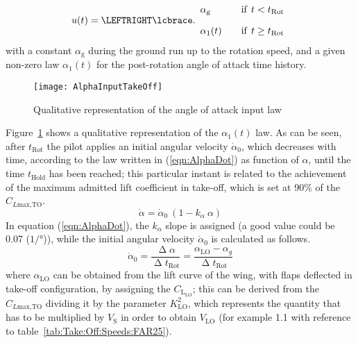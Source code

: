 \bigskip
\begin{equation}\label{eq:Take:Off:System:Dynamics:Alpha:Law}
u (t) =
    \LEFTRIGHT\lcbrace.{
      \begin{array}{l@{\rule{2em}{0pt}}l} 
        \alpha_{\text{g}}
          & \text{if} \;\, t < t_{\text{Rot}}
        \\[1em]
        \alpha_1(t)
          & \text{if} \;\, t \geq t_{\text{Rot}}
      \end{array}
    }
\end{equation}
%
with a constant $\alpha_{\text{g}}$ during the ground run up to the rotation speed, and a given non-zero law $\alpha_1(t)$ for the post-rotation angle of attack time history. 
%
\begin{figure}[!t]
\centering
\texttt{[image: AlphaInputTakeOff]}
\caption{Qualitative representation of the angle of attack input law}
\label{fig:AlphaInput}
\end{figure}
%
Figure~\ref{fig:AlphaInput} shows a qualitative representation of the $\alpha_1(t)$ law. As can be seen, after $t_{\text{Rot}}$ the pilot applies an initial angular velocity $\dot\alpha_{0}$, which decreases with time, according to the law written in (\ref{eqn:AlphaDot}) as function of $\alpha$, until the time $t_{\text{Hold}}$ has been reached; this particular instant is related to the achievement of the maximum admitted lift coefficient in take-off, which is set at 90\% of the $C_{L\text{max,TO}}$.
%
\begin{equation}
\dot\alpha=\dot\alpha_0\ \left(1-k_\alpha\ \alpha\right)
\label{eqn:AlphaDot}
\end{equation}
%
\noindent
In equation (\ref{eqn:AlphaDot}), the $k_\alpha$ slope is assigned (a good value could be 0.07 ($\si{1/\degree}$)), while the initial angular velocity $\dot\alpha_0$ is calculated as follows.
%
\begin{equation}
\dot\alpha_0=\dfrac{\upDelta\alpha}{\upDelta t_{\text{Rot}}}=\dfrac{\alpha_{\text{LO}}-\alpha_g}{\upDelta t_{\text{Rot}}}
\label{eqn:AlphaDotInitial}
\end{equation}
%
where $\alpha_{\text{LO}}$ can be obtained from the lift curve of the wing, with flaps deflected in take-off configuration, by assigning the $C_{\text{L}_{\text{LO}}}$; this can be derived from the $C_{L\text{max,TO}}$ dividing it by the parameter $K^2_{\text{LO}}$, which represents the quantity that has to be multiplied by $V_{\text{S}}$ in order to obtain $V_{\text{LO}}$ (for example 1.1 with reference to table~\ref{tab:Take:Off:Speeds:FAR25}).

